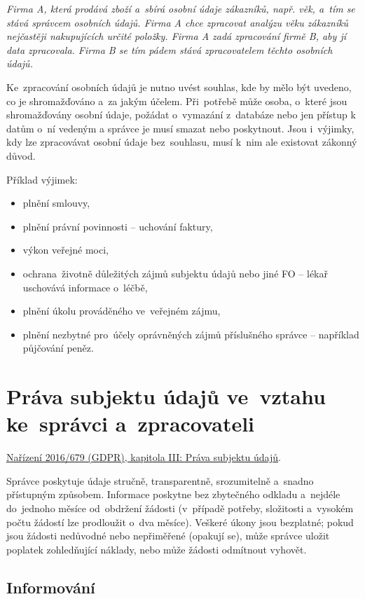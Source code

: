\emph{Firma A, která prodává zboží a~sbírá osobní údaje zákazníků, např. věk, a~tím se stává správcem osobních údajů. Firma A chce zpracovat analýzu věku zákazníků nejčastěji nakupujících určité položky. Firma A zadá zpracování firmě B, aby jí data zpracovala. Firma B se tím pádem stává zpracovatelem těchto osobních údajů.}

Ke~zpracování osobních údajů je nutno uvést souhlas, kde by mělo být uvedeno, co je shromažďováno a~za jakým účelem. Při~potřebě může osoba, o~které jsou shromažďovány osobní údaje, požádat o~vymazání z~databáze nebo jen přístup k datům o~ní vedeným a správce je musí smazat nebo poskytnout. Jsou i~výjimky, kdy lze zpracovávat osobní údaje bez~souhlasu, musí k~nim ale existovat zákonný důvod.

Příklad výjimek:

\begin{itemize}
    \item plnění smlouvy,
    \item plnění právní povinnosti -- uchování faktury,
    \item výkon veřejné moci,
    \item ochrana~životně důležitých zájmů subjektu údajů nebo jiné FO -- lékař uschovává informace o~léčbě,
    \item plnění úkolu prováděného ve~veřejném zájmu,
    \item plnění nezbytné pro~účely oprávněných zájmů příslušného správce -- například půjčování peněz.
\end{itemize}


\clearpage
\section{Práva subjektu údajů ve~vztahu ke~správci a~zpracovateli}

\href{https://eur-lex.europa.eu/legal-content/CS/TXT/HTML/?uri=CELEX:32016R0679#d1e2150-1-1}{Nařízení 2016/679 (GDPR), kapitola III: Práva subjektu údajů}.

Správce poskytuje údaje stručně, transparentně, srozumitelně a~snadno přístupným způsobem. Informace poskytne bez zbytečného odkladu a~nejdéle do~jednoho měsíce od~obdržení žádosti (v~případě potřeby, složitosti a~vysokém počtu žádostí lze prodloužit o~dva měsíce). Veškeré úkony jsou bezplatné; pokud jsou žádosti nedůvodné nebo nepřiměřené (opakují se), může správce uložit poplatek zohledňující náklady, nebo může žádosti odmítnout vyhovět.

\subsection*{Informování}

